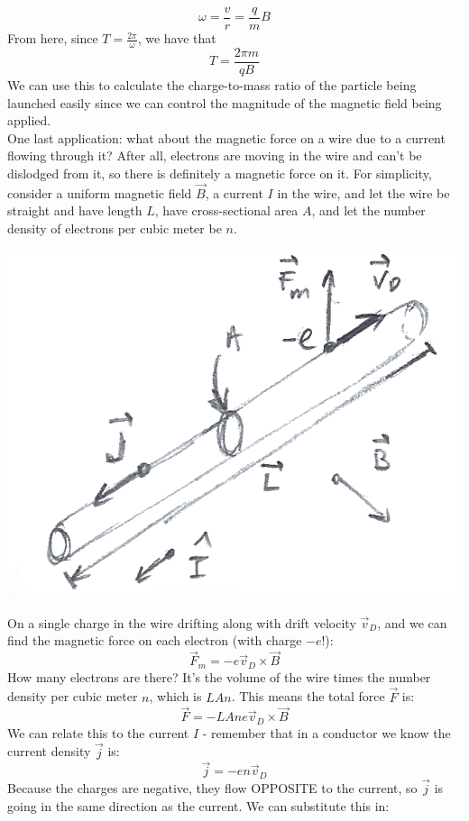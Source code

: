 \[
	\omega = \frac{v}{r} = \frac{q}{m}B
\]
From here, since $T = \frac{2\pi}{\omega}$, we have that 
\[
	T = \frac{2\pi m}{qB}
\]
We can use this to calculate the charge-to-mass ratio of the particle being launched easily since we can control the magnitude of the magnetic field being applied. \\
One last application: what about the magnetic force on a wire due to a current flowing through it? After all, electrons are moving in the wire and can't be dislodged from it, so there is definitely a magnetic force on it. For simplicity, consider a uniform magnetic field $\vec B$, a current $I$ in the wire, and let the wire be straight and have length $L$, have cross-sectional area $A$, and let the number density of electrons per cubic meter be $n$. \\
\begin{center}
	\includegraphics[scale=0.2]{images/em/magnetic-force-wire.png}
\end{center}
On a single charge in the wire drifting along with drift velocity $\vec v_D$, and we can find the magnetic force on each electron (with charge $-e$!):
\[
	\vec F_m = -e\vec v_D \times \vec B
\]
How many electrons are there? It's the volume of the wire times the number density per cubic meter $n$, which is $LAn$. This means the total force $\vec F$ is:
\[
	\vec F = -LAne\vec v_D \times \vec B
\]
We can relate this to the current $I$ - remember that in a conductor we know the current density $\vec j$ is:
\[
	\vec j = -en \vec v_D
\]
Because the charges are negative, they flow OPPOSITE to the current, so $\vec j$ is going in the same direction as the current. We can substitute this in:
